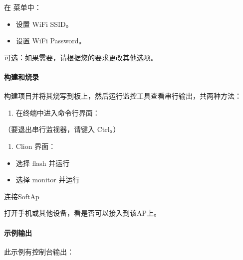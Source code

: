 \documentclass[a4paper,12pt,english]{sphinxmanual}
\begin{document}
{{\sphinxAtStartPar
在  菜单中：
\begin{itemize}
\item {} 
\sphinxAtStartPar
设置 WiFi SSID。

\item {} 
\sphinxAtStartPar
设置 WiFi Password。

\end{itemize}

\sphinxAtStartPar
可选：如果需要，请根据您的要求更改其他选项。


\paragraph{构建和烧录}
\label{\detokenize{exp-esp32/wifi/ap:id5}}
\sphinxAtStartPar
构建项目并将其烧写到板上，然后运行监控工具查看串行输出，共两种方法：
\begin{enumerate}
%
\item {} 
\sphinxAtStartPar
在终端中进入命令行界面：

\end{enumerate}

\sphinxAtStartPar
{}

\sphinxAtStartPar
（要退出串行监视器，请键入 Ctrl\sphinxhyphen{}{]}。）
\begin{enumerate}
%
\setcounter{enumi}{1}
\item {} 
\sphinxAtStartPar
Clion 界面：

\end{enumerate}
\begin{itemize}
\item {} 
\sphinxAtStartPar
选择 flash 并运行

\item {} 
\sphinxAtStartPar
选择 monitor 并运行

\end{itemize}

\sphinxAtStartPar
连接SoftAp

\sphinxAtStartPar
打开手机或其他设备，看是否可以接入到该AP上。


\paragraph{示例输出}
\label{\detokenize{exp-esp32/wifi/ap:id6}}
\sphinxAtStartPar
此示例有控制台输出：

}}
\end{document}
